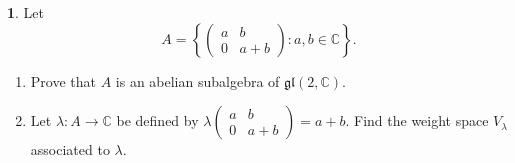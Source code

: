 \documentclass[12pt]{article}
\newcommand{\gl}{\mathfrak{gl}}
\theoremstyle{definition}
\newtheorem{ex}{}
\begin{document}
\begin{ex}
	Let \begin{equation*}
		A = \left\lbrace \begin{pmatrix} a & b \\ 0 & a + b \end{pmatrix} : a,b \in \mathbb{C} \right\rbrace.
	\end{equation*}
	\begin{enumerate}[label=(\alph*)]
		\item Prove that $A$ is an abelian subalgebra of $\gl(2,\mathbb{C})$.
		\item Let $\lambda : A \to \mathbb{C}$ be defined by $\lambda \begin{pmatrix}a & b \\ 0 & a+b\end{pmatrix} = a + b.$
		      Find the weight space $V_\lambda$ associated to $\lambda$.
	\end{enumerate}
\end{ex}
\end{document}

